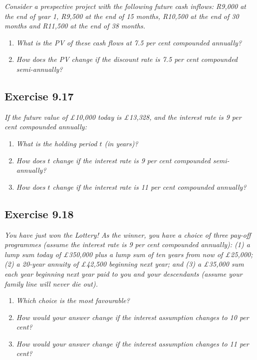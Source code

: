 \documentclass[]{book}
\theoremstyle{definition}
\theoremstyle{definition}
\theoremstyle{remark}
\begin{document}
\emph{Consider a prespective project with the following future cash
inflows: R9,000 at the end of year 1, R9,500 at the end of 15 months,
R10,500 at the end of 30 months and R11,500 at the end of 38 months.}
\citep[p.308]{book}

\begin{enumerate}
\def\labelenumi{\alph{enumi}.}
\item
  \emph{What is the PV of these cash flows at 7.5 per cent compounded
  annually?} \citep[p.308]{book}
\item
  \emph{How does the PV change if the discount rate is 7.5 per cent
  compounded semi-annually?} \citep[p.308]{book}
\end{enumerate}

\subsection{Exercise 9.17}\label{exercise-9.17}

\emph{If the future value of £10,000 today is £13,328, and the interest
rate is 9 per cent compounded annually:} \citep[p.308]{book}

\begin{enumerate}
\def\labelenumi{\alph{enumi}.}
\item
  \emph{What is the holding period \(t\) (in years)?}
  \citep[p.308]{book}
\item
  \emph{How does \(t\) change if the interest rate is 9 per cent
  compounded semi-annually?} \citep[p.308]{book}
\item
  \emph{How does \(t\) change if the interest rate is 11 per cent
  compounded annually?} \citep[p.308]{book}
\end{enumerate}

\subsection{Exercise 9.18}\label{exercise-9.18}

\emph{You have just won the Lottery! As the winner, you have a choice of
three pay-off programmes (assume the interest rate is 9 per cent
compounded annually): (1) a lump sum today of £350,000 plus a lump sum
of ten years from now of £25,000; (2) a 20-year annuity of £42,500
beginning next year; and (3) a £35,000 sum each year beginning next year
paid to you and your descendants (assume your family line will never die
out).} \citep[p.308]{book}

\begin{enumerate}
\def\labelenumi{\alph{enumi}.}
\item
  \emph{Which choice is the most favourable?} \citep[p.308]{book}
\item
  \emph{How would your answer change if the interest assumption changes
  to 10 per cent?} \citep[p.308]{book}
\item
  \emph{How would your answer change if the interest assumption changes
  to 11 per cent?} \citep[p.308]{book}
\end{enumerate}
\end{document}
